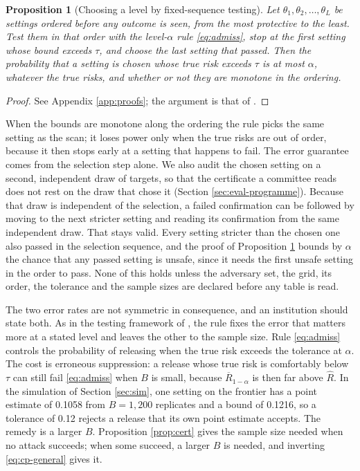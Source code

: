 \documentclass[11pt,a4paper]{article}
\theoremstyle{plain}
\newtheorem{proposition}{Proposition}
\theoremstyle{definition}
\theoremstyle{definition}
\theoremstyle{plain}
\begin{document}
\begin{proposition}[Choosing a level by fixed-sequence testing]\label{prop:fixedseq}
Let $\theta_1, \theta_2, \dots, \theta_L$ be settings ordered before any outcome
is seen, from the most protective to the least. Test them in that order with the
level-$\alpha$ rule \eqref{eq:admiss}, stop at the first setting whose bound
exceeds $\tau$, and choose the last setting that passed. Then the probability
that a setting is chosen whose true risk exceeds $\tau$ is at most $\alpha$,
whatever the true risks, and whether or not they are monotone in the ordering.
\end{proposition}

\begin{proof}
See Appendix \ref{app:proofs}; the argument is that of
\citet{maurer1995}.
\end{proof}

When the bounds are monotone along the ordering the rule picks the same setting
as the scan; it loses power only when the true risks are out of order, because
it then stops early at a setting that happens to fail. The error guarantee comes
from the selection step alone. We also audit the chosen setting on a second,
independent draw of targets, so that the certificate a committee reads does not
rest on the draw that chose it (Section \ref{sec:eval-programme}). Because that
draw is independent of the selection, a failed confirmation can be followed by
moving to the next stricter setting and reading its confirmation from the same
independent draw. That stays valid. Every setting stricter than the chosen one also passed in the
selection sequence, and the proof of Proposition \ref{prop:fixedseq} bounds by
$\alpha$ the chance that any passed setting is unsafe, since it needs the first
unsafe setting in the order to pass. None of this holds unless the adversary
set, the grid, its order, the tolerance and the sample sizes are declared before
any table is read.

The two error rates are not symmetric in consequence, and an institution should
state both. As in the testing framework of \citet{neyman1933}, the rule fixes
the error that matters more at a stated level and leaves the other to the sample
size. Rule \eqref{eq:admiss} controls the probability of releasing when
the true risk exceeds the tolerance at $\alpha$. The cost is erroneous
suppression: a release whose true risk is comfortably below $\tau$
can still fail \eqref{eq:admiss} when $B$ is small, because $\overline{R}_{1-\alpha}$ is
then far above $\widehat{R}$. In the simulation of Section \ref{sec:sim}, one setting on
the frontier has a point estimate of 0.1058 from $B = 1{,}200$ replicates and a
bound of 0.1216, so a tolerance of 0.12 rejects a release that its own point
estimate accepts. The remedy is a larger $B$. Proposition \ref{prop:cert}
gives the sample size needed when no attack succeeds; when some succeed, a
larger $B$ is needed, and inverting \eqref{eq:cp-general} gives it.
\end{document}
